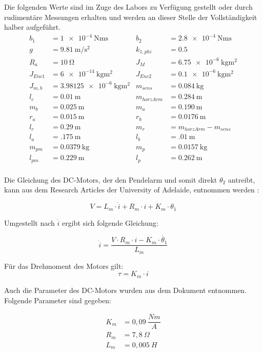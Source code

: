 Die folgenden Werte sind im Zuge des Labors zu Verfügung gestellt oder durch rudimentäre Messungen erhalten und werden an dieser Stelle der Vollständigkeit halber aufgeführt. 
\begin{align*}
b_1 &= \SI{1e-4}{\newton\metre\second} &
b_2 &= \SI{2.8e-4}{\newton\metre\second} \\
g &= \SI{9.81}{\metre\per\square\second} &
k_{1,phi} &= \SI{0.5}{}\\
R_a &= \SI{10}{\ohm} &
J_M  &=  \SI{6.75e-6}{\kilo\gram\square\metre}  \\        %
J_{Enc1}  &=  \SI{6e-14}{\kilo\gram\square\metre}  &        %
J_{Enc2}  &=  \SI{0.1e-6}{\kilo\gram\square\metre}  \\     %
J_{m,b}  &=  \SI{3.98125e-6}{\kilo\gram\square\metre}  &     %
m_{sens}  &=  \SI{0.084}{\kilo\gram}  \\
l_c  &=  \SI{0.01}{\metre}  &
m_{horzArm} &= \SI{0.284}{\metre} \\
m_b &= \SI{0.025}{\metre}  &
m_a &= \SI{0.190}{\metre} \\
r_a &= \SI{0.015}{\metre}  &
r_b &= \SI{0.0176}{\metre} \\
l_r &= \SI{0.29}{\metre} &
m_r  &=  m_{horzArm} - m_{sens}\\
l_a &= \SI{.175}{\metre} &
l_b &= \SI{.01}{\metre}\\
m_{pm} &= \SI{0.0379}{\kilo\gram} &
m_p &= \SI{0.0157}{\kilo\gram}\\
l_{pm} &= \SI{0.229}{\metre} &
l_p &= \SI{0.262}{\metre}\\
\end{align*}

Die Gleichung des DC-Motors, der den Pendelarm und somit direkt $\theta_2$ antreibt, kann aus dem Research Articles der University of Adelaide, entnommen werden \citep{Cazzolato.2011}:

\begin{equation}
V = L_m \cdot \dot{i} + R_m \cdot i + K_m \cdot \theta_1
\end{equation}

Umgestellt nach $ \dot{i}$ ergibt sich folgende Gleichung:

\begin{equation}
 \dot{i} = \dfrac{V \cdot R_m \cdot i - K_m \cdot \dot{\theta_1}}{L_m}
\end{equation}

Für das Drehmoment des Motors gilt:
\begin{equation}
\tau = K_m \cdot i 
\end{equation}

Auch die Parameter des DC-Motors wurden aus dem Dokument entnommen. Folgende Parameter sind gegeben:

\begin{align}
K_m &= 0,09 ~\dfrac{Nm}{A} \\
R_m &= 7,8  ~\Omega \\
L_m &= 0,005  ~H 
\end{align}
